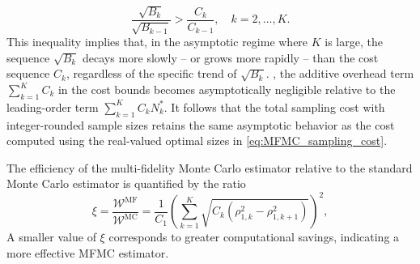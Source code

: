 %
\begin{equation}
\label{eq:Bk_Ck_decay_rate}
    \frac{\sqrt{B_{k}}}{\sqrt{B_{k-1}}}>\frac{C_{k}}{C_{k-1}}, \quad k=2,\ldots,K.
\end{equation}
%
This inequality implies that, in the asymptotic regime where $K$ is large,  the sequence $\sqrt{B_k}$ decays more slowly -- or grows more rapidly -- than the cost sequence $C_k$, regardless of the specific trend of $\sqrt{B_k}$. , the additive overhead term
$\sum_{k=1}^K C_k$ in the cost bounds becomes asymptotically negligible relative to the leading-order term $\sum_{k=1}^K C_kN_k^*$. It follows that the total sampling cost with integer-rounded sample sizes retains the same asymptotic behavior as the cost computed using the real-valued optimal sizes in \eqref{eq:MFMC_sampling_cost}.



The efficiency of the multi-fidelity Monte Carlo estimator relative to the standard Monte Carlo estimator is quantified by the ratio
%
\begin{equation}\label{eq:MFMC_sampling_cost_efficiency}
    \xi = \frac{\mathcal{W}^\text{MF}}{\mathcal{W}^\text{MC}} = \frac{1}{C_1} \left(\sum_{k=1}^K\sqrt{C_k\left(\rho_{1,k}^2 - \rho_{1,k+1}^2\right)}\right)^2,
\end{equation}
%
A smaller value of $\xi$ corresponds to greater computational savings, indicating a more effective MFMC estimator.

